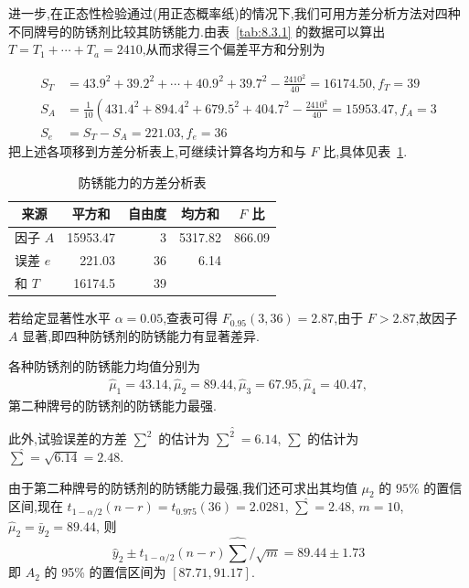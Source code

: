 \begin{example}
进一步,在正态性检验通过(用正态概率纸)的情况下,我们可用方差分析方法对四种不同牌号的防锈剂比较其防锈能力.由表~\ref{tab:8.3.1} 的数据可以算出 $T = T_1 + \cdots + T_a = 2410$,从而求得三个偏差平方和分别为

\begin{align*}
S_{T} & =43.9^{2}+39.2^{2}+\cdots+40.9^{2}+39.7^{2}-\frac{2410^{2}}{40}=16174.50, f_{T}=39 \\
S_{A} & =\frac{1}{10}\left(431.4^{2}+894.4^{2}+679.5^{2}+404.7^{2}-\frac{2410^{2}}{40}=15953.47, f_{A}=3\right. \\ 
S_{e} & =S_{T}-S_{A}=221.03, f_{e} = 36
\end{align*}
把上述各项移到方差分析表上,可继续计算各均方和与 $F$ 比,具体见表~\ref{tab:8.3.2}.

\begin{table}[htbp]
  \centering
  \caption{防锈能力的方差分析表}
    \begin{tabular}{lrrrr}
    \toprule
    \multicolumn{1}{c}{来源} & \multicolumn{1}{c}{平方和} & \multicolumn{1}{c}{自由度} & \multicolumn{1}{c}{均方和} & \multicolumn{1}{c}{$F$ 比} \\
    \midrule
    因子 $A$   & 15953.47 & 3     & 5317.82 & 866.09 \\
    误差 $e$   & 221.03 & 36    & 6.14  &  \\
    和 $T$    & 16174.5 & 39    &       &  \\
    \bottomrule
    \end{tabular}%
  \label{tab:8.3.2}%
\end{table}%


若给定显著性水平 $\alpha = 0.05$,查表可得 $F_{0.95}(3,36)=2.87$,由于 $F>2.87$,故因子 $A$ 显著,即四种防锈剂的防锈能力有显著差异.

各种防锈剂的防锈能力均值分别为
\begin{gather*}
\hat{\mu}_1=43.14, \hat{\mu}_2=89.44, \hat{\mu}_3=67.95, \hat{\mu}_4 = 40.47,
\end{gather*}
第二种牌号的防锈剂的防锈能力最强.
  
此外,试验误差的方差 $\sum^2$ 的估计为 $\hat{\sum^2}=6.14$, $\sum$ 的估计为 $\hat{\sum}=\sqrt{6.14}=
2.48$.

由于第二种牌号的防锈剂的防锈能力最强,我们还可求出其均值 $\mu_2$ 的 $95\%$ 的置信区间,现在 $t_{1-\alpha/2}(n-r)=t_{0.975}(36)=2.0281$, $\hat{\sum}=2.48$, $m=10$, $\hat{\mu}_2=\bar{y}_2=89.44$, 则
\begin{equation*}
  \hat{y}_{2} \pm t_{1-\alpha / 2}(n-r) \hat{\sum} / \sqrt{m}=89.44 \pm 1.73
\end{equation*}
即 $A_2$ 的 95\% 的置信区间为 $[87.71, 91.17]$.
\end{example}

